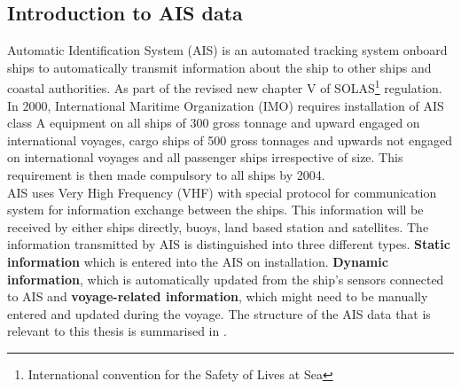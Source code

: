 \subsection{Introduction to AIS data}\label{ais_theo}

Automatic Identification System (AIS) is an automated tracking system onboard ships to automatically transmit information about the ship to other ships and coastal authorities. As part of the revised new chapter V of SOLAS\footnote{International convention for the Safety of Lives at Sea} regulation. In 2000, International Maritime Organization (IMO) requires installation of AIS class A equipment on all ships of 300 gross tonnage and upward engaged on international voyages, cargo ships of 500 gross tonnages and upwards not engaged on international voyages and all passenger ships irrespective of size. This requirement is then made compulsory to all ships by 2004. \cite{Rakke2016,webimo.2014}\\

AIS uses Very High Frequency (VHF) with special protocol for communication system for information exchange between the ships. This information will be received by either ships directly, buoys, land based station and satellites. The information transmitted by AIS is distinguished into three different types. \textbf{Static information} which is entered into the AIS on installation. \textbf{Dynamic information}, which is automatically updated from the ship's sensors connected to AIS and \textbf{voyage-related information}, which might need to be manually entered and updated during the voyage. The structure of the AIS data that is relevant to this thesis is summarised in \cite{webimo.2014}.\\


